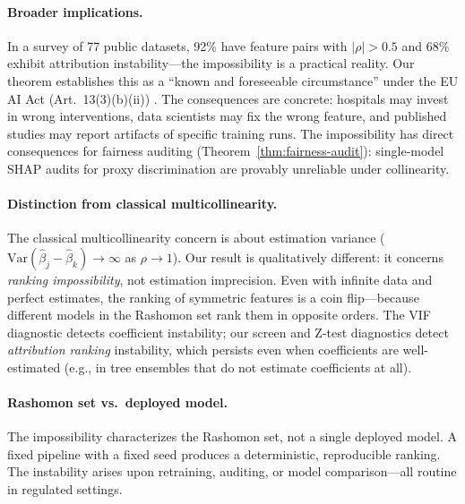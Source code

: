 \documentclass{article}
\newcommand{\Var}{\mathrm{Var}}
\begin{document}
\paragraph{Broader implications.}
\begin{sloppypar}
In a survey of 77 public datasets, 92\% have feature pairs with $|\rho| > 0.5$ and
68\% exhibit attribution instability---the impossibility is a practical
reality. Our theorem establishes this as a ``known and foreseeable circumstance'' under the
EU AI Act (Art.~13(3)(b)(ii)) \citep{euaiact2024}.
The consequences are concrete: hospitals may invest in wrong interventions, data
scientists may fix the wrong feature, and published studies may report artifacts of
specific training runs.
The impossibility has direct consequences for fairness auditing
(Theorem~\ref{thm:fairness-audit}): single-model SHAP audits for proxy discrimination
are provably unreliable under collinearity.
\end{sloppypar}

\paragraph{Distinction from classical multicollinearity.}
The classical multicollinearity concern is about estimation variance ($\Var(\hat\beta_j - \hat\beta_k) \to \infty$ as $\rho \to 1$). Our result is qualitatively different: it concerns \emph{ranking impossibility}, not estimation imprecision. Even with infinite data and perfect estimates, the ranking of symmetric features is a coin flip---because different models in the Rashomon set rank them in opposite orders. The VIF diagnostic detects coefficient instability; our screen and Z-test diagnostics detect \emph{attribution ranking} instability, which persists even when coefficients are well-estimated (e.g., in tree ensembles that do not estimate coefficients at all).

\paragraph{Rashomon set vs.\ deployed model.}
The impossibility characterizes the Rashomon set, not a single deployed model. A fixed pipeline with a fixed seed produces a deterministic, reproducible ranking. The instability arises upon retraining, auditing, or model comparison---all routine in regulated settings.
\end{document}
